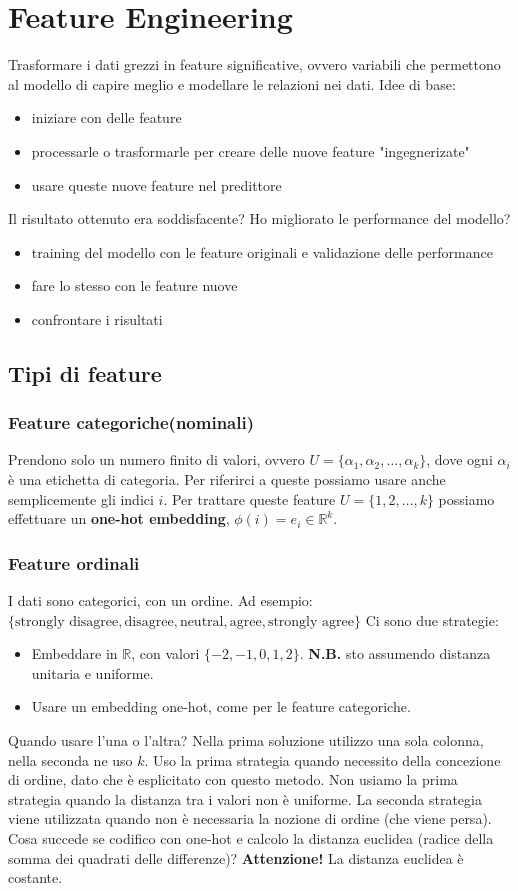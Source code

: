\documentclass{../main.tex}[subfiles]
\begin{document}
\chapter{Feature Engineering}
 Trasformare i dati grezzi in feature significative, ovvero variabili che permettono al modello di capire meglio e modellare le relazioni nei dati.
Idee di base:
\begin{itemize}
	\item iniziare con delle feature
	\item processarle o trasformarle per creare delle nuove feature "ingegnerizate"
	\item usare queste nuove feature nel predittore
\end{itemize}
Il risultato ottenuto era soddisfacente? Ho migliorato le performance del modello?
\begin{itemize}
	\item training del modello con le feature originali e validazione delle performance
	\item fare lo stesso con le feature nuove
	\item confrontare i risultati
\end{itemize}
\section{Tipi di feature}
\subsection{Feature categoriche(nominali)}
Prendono solo un numero finito di valori, ovvero $U=\{\alpha_1, \alpha_2, \ldots, \alpha_k\}$, dove ogni $\alpha_i$ è una etichetta di categoria.
Per riferirci a queste possiamo usare anche semplicemente gli indici $i$.
Per trattare queste feature $U=\{1, 2, \ldots, k\}$ possiamo effettuare un \textbf{one-hot embedding}, $\phi(i)=e_i\in \mathbb{R}^k$.
\subsection{Feature ordinali}
I dati sono categorici, con un ordine. 
Ad esempio: $\{\text{strongly disagree}, \text{disagree}, \text{neutral}, \text{agree}, \text{strongly agree}\}$
Ci sono due strategie:
\begin{itemize}
	\item Embeddare in $\mathbb{R}$, con valori $\{-2, -1, 0, 1, 2\}$. \textbf{N.B.} sto assumendo distanza unitaria e uniforme.
	\item Usare un embedding one-hot, come per le feature categoriche.
\end{itemize}
Quando usare l'una o l'altra?
Nella prima soluzione utilizzo una sola colonna, nella seconda ne uso $k$. Uso la prima strategia quando necessito della concezione di ordine, dato che è esplicitato con questo metodo.
Non usiamo la prima strategia quando la distanza tra i valori non è uniforme.
La seconda strategia viene utilizzata quando non è necessaria la nozione di ordine (che viene persa).
\\
Cosa succede se codifico con one-hot e calcolo la distanza euclidea (radice della somma dei quadrati delle differenze)? \textbf{Attenzione!} La distanza euclidea è costante.
\end{document}
